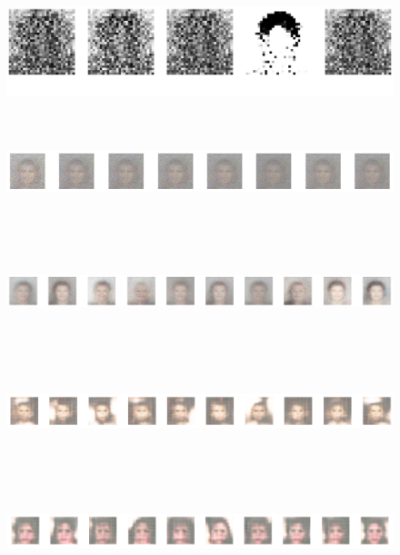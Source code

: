 \documentclass[12pt]{article}
\begin{document}
\begin{figure}[H]
    \centering
    \includegraphics[width=1\textwidth, height=3cm, keepaspectratio]{1.png}
    \label{fig:enter-label}
\end{figure}
\begin{figure}[H]
    \centering
    \includegraphics[width=1\textwidth, height=3cm, keepaspectratio]{2.png}
    \label{fig:enter-label}
\end{figure}
\begin{figure}[H]
    \centering
    \includegraphics[width=1\textwidth, height=3cm, keepaspectratio]{4.png}
    \label{fig:enter-label}
\end{figure}
\begin{figure}[H]
    \centering
    \includegraphics[width=1\textwidth, height=3cm, keepaspectratio]{5.png}
    \label{fig:enter-label}
\end{figure}
\begin{figure}[H]
    \centering
    \includegraphics[width=1\textwidth, height=3cm, keepaspectratio]{6.png}
    \label{fig:enter-label}
\end{figure}
\end{document}
